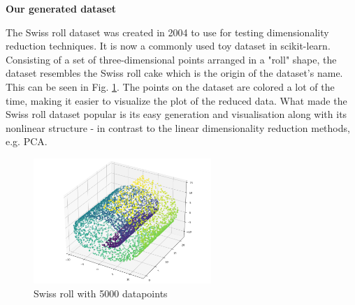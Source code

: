 



\textbf{Our generated dataset} \cite{swiss-roll}

The Swiss roll dataset was created in 2004 to use for testing dimensionality reduction techniques. It is now a commonly used toy dataset in scikit-learn. Consisting of a set of three-dimensional points arranged in a "roll" shape, the dataset resembles the Swiss roll cake which is the origin of the dataset's name. This can be seen in Fig. \ref{fig:swiss-roll}. The points on the dataset are colored a lot of the time, making it easier to visualize the plot of the reduced data. What made the Swiss roll dataset popular is its easy generation and visualisation along with its nonlinear structure - in contrast to the linear dimensionality reduction methods, e.g. PCA. \\

\begin{figure}[H]
    \centering
    \includegraphics[width=0.6\textwidth]{images/swissRoll5000.png}
    \caption{Swiss roll with 5000 datapoints}
    \label{fig:swiss-roll}
\end{figure}


